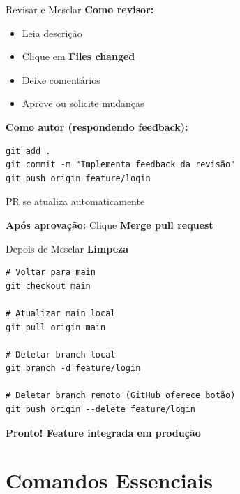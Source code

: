\documentclass[11pt]{beamer}
\begin{document}
\begin{frame}{Revisar e Mesclar}
\textbf{Como revisor:}

\begin{itemize}
    \item Leia descrição
    \item Clique em \textbf{Files changed}
    \item Deixe comentários
    \item Aprove ou solicite mudanças
\end{itemize}

\vspace{0.5cm}

\textbf{Como autor (respondendo feedback):}

\begin{lstlisting}
git add .
git commit -m "Implementa feedback da revisão"
git push origin feature/login
\end{lstlisting}

PR se atualiza automaticamente

\vspace{0.3cm}

\textbf{Após aprovação:} Clique \textbf{Merge pull request}
\end{frame}

\begin{frame}{Depois de Mesclar}
\textbf{Limpeza}

\begin{lstlisting}
# Voltar para main
git checkout main

# Atualizar main local
git pull origin main

# Deletar branch local
git branch -d feature/login

# Deletar branch remoto (GitHub oferece botão)
git push origin --delete feature/login
\end{lstlisting}

\vspace{0.3cm}

\textbf{Pronto! Feature integrada em produção}
\end{frame}

\section{Comandos Essenciais}
\end{document}
